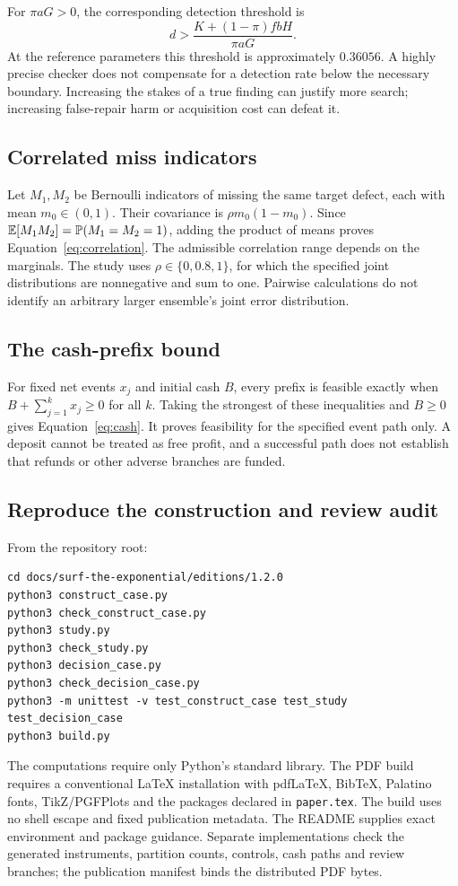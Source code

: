 For $\pi aG>0$, the corresponding detection threshold is
\begin{equation}
d>\frac{K+(1-\pi)fbH}{\pi aG}.
\end{equation}
At the reference parameters this threshold is approximately $0.36056$. A highly precise checker does not compensate for a detection rate below the necessary boundary. Increasing the stakes of a true finding can justify more search; increasing false-repair harm or acquisition cost can defeat it.

\subsection{Correlated miss indicators}
Let $M_1,M_2$ be Bernoulli indicators of missing the same target defect, each with mean $m_0\in(0,1)$. Their covariance is $\rho m_0(1-m_0)$. Since $\mathbb{E}[M_1M_2]=\mathbb{P}(M_1=M_2=1)$, adding the product of means proves Equation~\eqref{eq:correlation}. The admissible correlation range depends on the marginals. The study uses $\rho\in\{0,0.8,1\}$, for which the specified joint distributions are nonnegative and sum to one. Pairwise calculations do not identify an arbitrary larger ensemble's joint error distribution.

\subsection{The cash-prefix bound}
For fixed net events $x_j$ and initial cash $B$, every prefix is feasible exactly when $B+\sum_{j=1}^{k}x_j\geq0$ for all $k$. Taking the strongest of these inequalities and $B\geq0$ gives Equation~\eqref{eq:cash}. It proves feasibility for the specified event path only. A deposit cannot be treated as free profit, and a successful path does not establish that refunds or other adverse branches are funded.

\subsection{Reproduce the construction and review audit}
From the repository root:
\begin{lstlisting}
cd docs/surf-the-exponential/editions/1.2.0
python3 construct_case.py
python3 check_construct_case.py
python3 study.py
python3 check_study.py
python3 decision_case.py
python3 check_decision_case.py
python3 -m unittest -v test_construct_case test_study test_decision_case
python3 build.py
\end{lstlisting}
The computations require only Python's standard library. The PDF build requires a conventional LaTeX installation with pdfLaTeX, BibTeX, Palatino fonts, TikZ/PGFPlots and the packages declared in \texttt{paper.tex}. The build uses no shell escape and fixed publication metadata. The README supplies exact environment and package guidance. Separate implementations check the generated instruments, partition counts, controls, cash paths and review branches; the publication manifest binds the distributed PDF bytes.

